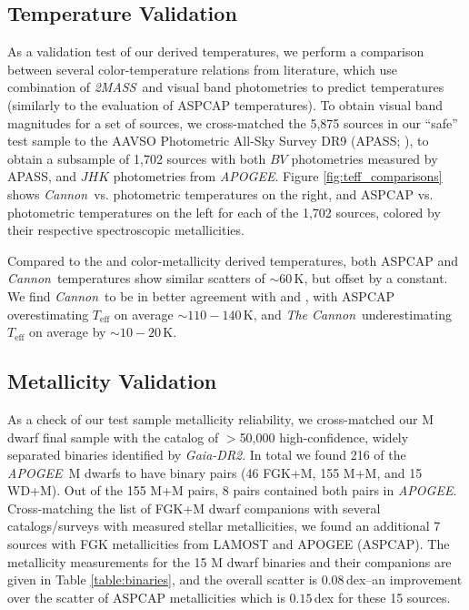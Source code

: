 \documentclass[twocolumn]{aastex62}
\newcommand{\apogee}{\textsl{APOGEE}}
\newcommand{\thecannon}{\textsl{The Cannon}}
\newcommand{\cannon}{\textsl{Cannon}}
\newcommand{\drtwo}{\textsl{Gaia-DR2}}
\newcommand{\zmass}{\textsl{2MASS}}
\newcommand{\teff}{T_{\mathrm{eff}}}
\begin{document}
\subsection{Temperature Validation}

As a validation test of our derived temperatures, we perform a comparison between several color-temperature relations from literature, which use combination of \zmass\ and visual band photometries to predict temperatures (similarly to the \citealt{Schmidt:2016} evaluation of ASPCAP temperatures). To obtain visual band magnitudes for a set of sources, we cross-matched the 5,875 sources in our ``safe'' test sample to the AAVSO Photometric All-Sky Survey DR9 (APASS; \citealt{Henden:2016}), to obtain a subsample of 1,702 sources with both $BV$ photometries measured by APASS, and $JHK$ photometries from \apogee. Figure \ref{fig:teff_comparisons} shows \cannon\ vs. photometric temperatures on the right, and ASPCAP vs. photometric temperatures on the left for each of the 1,702 sources, colored by their respective spectroscopic metallicities.

Compared to the \citealt{Mann:2015} and \citealt{Boyajian:2012} color-metallicity derived temperatures, both ASPCAP and \cannon\ temperatures show similar scatters of $\sim60\,$K, but offset by a constant.
We find \cannon\ to be in better agreement with \citealt{Mann:2015} and \citealt{Boyajian:2012}, with ASPCAP overestimating $\teff$ on average $\sim110-140\,$K, and \thecannon\ underestimating $\teff$ on average by $\sim10-20\,$K. \\


\subsection{Metallicity Validation}

As a check of our test sample metallicity reliability, we cross-matched our M dwarf final sample with the \citealt{Elbadry:2018b} catalog of $>$50,000 high-confidence, widely separated binaries identified by \drtwo. 
In total we found 216 of the \apogee\ M dwarfs to have binary pairs (46 FGK+M, 155 M+M, and 15 WD+M). Out of the 155 M+M pairs, 8 pairs contained both pairs in \apogee. Cross-matching the list of FGK+M dwarf companions with several catalogs/surveys with measured stellar metallicities, we found an additional 7 sources with FGK metallicities from LAMOST \citep{Zhao:2012} and APOGEE (ASPCAP). The metallicity measurements for the 15 M dwarf binaries and their companions are given in Table \ref{table:binaries}, and the overall scatter is $0.08\,$dex--an improvement over the scatter of ASPCAP metallicities which is $0.15\,$dex for these 15 sources.
\end{document}
